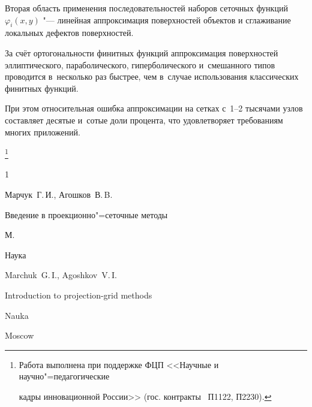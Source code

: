 Вторая область применения последовательностей наборов сеточных функций $\varphi _{i} (x, y)$ "--- линейная аппроксимация поверхностей объектов и  сглаживание локальных дефектов поверхностей. 

За счёт ортогональности финитных функций аппроксимация поверхностей эллиптического, параболического, гиперболического и~смешанного типов проводится в~несколько раз быстрее, чем в~случае использования классических финитных функций. 

При этом относительная ошибка аппроксимации на сетках с~1--2  тысячами узлов составляет десятые и~сотые доли процента, что удовлетворяет требованиям многих приложений.



\thanks{Работа выполнена при поддержке ФЦП <<Научные и научно"=педагогические 

кадры инновационной России>> (гос. контракты \No\No\ П1122, П2230).}





\begin{thebibliography}{1}


\by Марчук~Г.\,И., Агошков~В.\,B.

\book Введение в проекционно"=сеточные методы

\publaddr М.

\publ Наука



\misctransl 

\by Marchuk~G.\,I., Agoshkov~V.\,I.

\book Introduction to projection-grid methods

\publ Nauka

\publaddr Moscow







\end{thebibliography}



\hskip6.5cm \thedate \par

\hskip6.5cm\therevdate\par



\vspace{-10mm}



\makeengtitle



\renewcommand{\baselinestretch}{0.9}

\newpage



%



